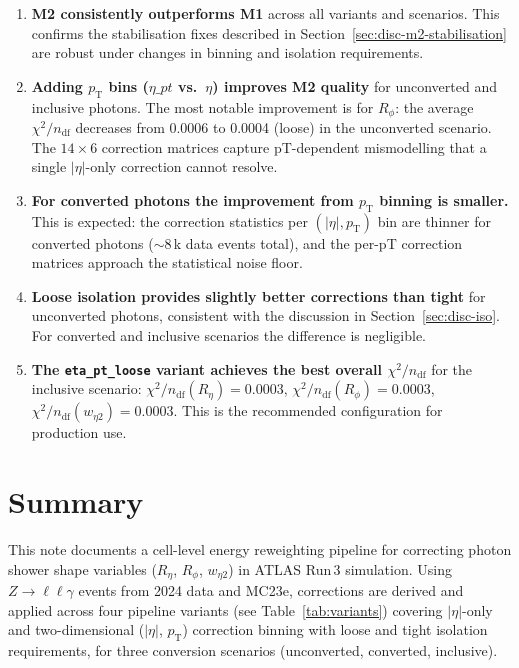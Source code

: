 \documentclass[11pt,a4paper]{article}
\newcommand{\Reta}{\ensuremath{R_{\eta}}}
\newcommand{\Rphi}{\ensuremath{R_{\phi}}}
\newcommand{\weta}{\ensuremath{w_{\eta 2}}}
\newcommand{\abseta}{\ensuremath{|\eta|}}
\newcommand{\chisq}{\ensuremath{\chi^2 / n_{\mathrm{df}}}}
\newcommand{\pt}{\ensuremath{p_{\mathrm{T}}}}
\begin{document}
\begin{enumerate}
  \item \textbf{M2 consistently outperforms M1} across all variants and
        scenarios.  This confirms the stabilisation fixes described in
        Section~\ref{sec:disc-m2-stabilisation} are robust under
        changes in binning and isolation requirements.

  \item \textbf{Adding $\pt$ bins ($\eta\_pt$ vs.\ $\eta$) improves M2
        quality} for unconverted and inclusive photons.  The most
        notable improvement is for \Rphi: the average $\chisq$ decreases
        from 0.0006 to 0.0004 (loose) in the unconverted scenario.
        The $14 \times 6$ correction matrices capture pT-dependent
        mismodelling that a single $\abseta$-only correction cannot
        resolve.

  \item \textbf{For converted photons the improvement from $\pt$ binning
        is smaller.}  This is expected: the correction statistics per
        $(\abseta, \pt)$ bin are thinner for converted photons
        ($\sim$8\,k data events total), and the per-pT correction
        matrices approach the statistical noise floor.

  \item \textbf{Loose isolation provides slightly better corrections
        than tight} for unconverted photons, consistent with the
        discussion in Section~\ref{sec:disc-iso}.  For converted and
        inclusive scenarios the difference is negligible.

  \item \textbf{The \texttt{eta\_pt\_loose} variant achieves the best
        overall $\chisq$} for the inclusive scenario:
        $\chisq(\Reta) = 0.0003$, $\chisq(\Rphi) = 0.0003$,
        $\chisq(\weta) = 0.0003$.  This is the recommended
        configuration for production use.
\end{enumerate}


\section{Summary}
\label{sec:summary}

This note documents a cell-level energy reweighting pipeline for
correcting photon shower shape variables (\Reta, \Rphi, \weta) in ATLAS
Run\,3 simulation.  Using $Z \to \ell\ell\gamma$ events from 2024 data
and MC23e, corrections are derived and applied across four pipeline
variants (see Table~\ref{tab:variants}) covering $|\eta|$-only and
two-dimensional ($|\eta|$, $\pt$) correction binning with loose and tight
isolation requirements, for three conversion scenarios (unconverted,
converted, inclusive).
\end{document}
